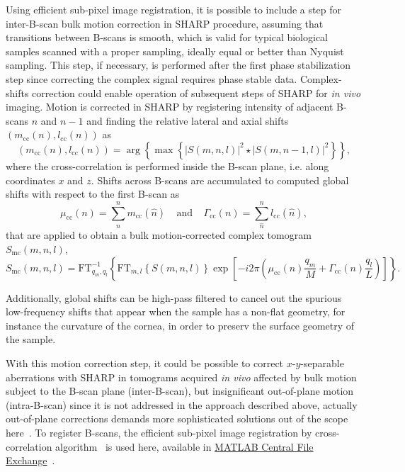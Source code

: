 Using efficient sub-pixel image registration, it is possible to include a step for inter-B-scan bulk motion correction in SHARP procedure, assuming that transitions between B-scans is smooth, which is valid for typical biological samples scanned with a proper sampling, ideally equal or better than Nyquist sampling. This step, if necessary, is performed after the first phase stabilization step since correcting the complex signal requires phase stable data. Complex-shifts correction could enable operation of subsequent steps of SHARP for \textit{in vivo} imaging. Motion is corrected in SHARP by registering intensity of adjacent B-scans $n$ and $n-1$ and finding the relative lateral and axial shifts $(m_\text{cc}(n), l_\text{cc}(n))$ as
\begin{equation}
    (m_\text{cc}(n), l_\text{cc}(n)) = \arg\left\{\max\left\{ |S(m,n,l)|^2\star |S(m,n-1,l)|^2 \right\}\right\},
\end{equation}
where the cross-correlation is performed inside the B-scan plane, i.e. along coordinates $x$ and $z$. Shifts across B-scans are accumulated to computed global shifts with respect to the first B-scan as
\begin{equation}
    \mu_{\text{cc}}(n) = \sum_{\hat{n}}^n m_{\text{cc}}(\hat{n}) \ \ \ \ \ \text{and} \ \ \ \ \  \Gamma_{\text{cc}}(n) = \sum_{\hat{n}}^n l_{\text{cc}}(\hat{n}),
\end{equation}
that are applied to obtain a bulk motion-corrected complex tomogram $S_\text{mc}(m,n,l)$,
\begin{equation}
    S_\text{mc}(m,n,l) = \text{FT}^{-1}_{q_m,q_l}\left\{\text{FT}_{m,l}\left\{S(m,n,l)\right\} \exp\left[-i2\pi\left( \mu_{\text{cc}}(n)\frac{q_m}{M} + \Gamma_{\text{cc}}(n)\frac{q_l}{L}\right)\right]\right\}.
\end{equation}

Additionally, global shifts can be high-pass filtered to cancel out the spurious low-frequency shifts that appear when the sample has a non-flat geometry, for instance the curvature of the cornea, in order to preserv the surface geometry of the sample.

With this motion correction step, it could be possible to correct $x$-$y$-separable aberrations with SHARP in tomograms acquired \textit{in vivo} affected by bulk motion subject to the B-scan plane (inter-B-scan), but insignificant out-of-plane motion (intra-B-scan) since it is not addressed in the approach described above, actually out-of-plane corrections demands more sophisticated solutions out of the scope here~\cite{Kraus2012_Motion}. To register B-scans, the efficient sub-pixel image registration by cross-correlation algorithm~\cite{Guizar-Sicairos2008_Efficient} is used here, available in \href{https://www.mathworks.com/matlabcentral/fileexchange/18401-efficient-subpixel-image-registration-by-cross-correlation}{MATLAB Central File Exchange}~\cite{Guizar2020_Efficient}.

